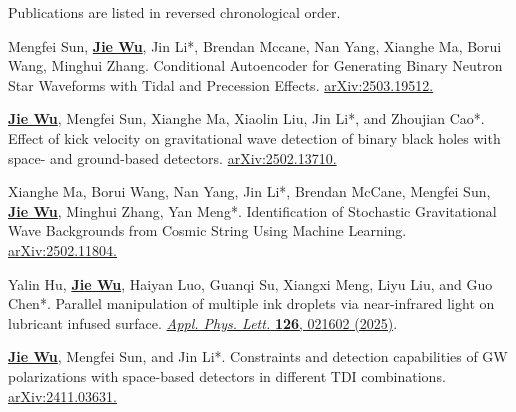 


\begin{cvparagraph}
    Publications are listed in reversed chronological order.
\end{cvparagraph}

\begin{cvpublications}
\begin{pubitems} 
\item {Mengfei Sun, \textbf{\underline{Jie Wu}}, Jin Li*, Brendan Mccane, Nan Yang, Xianghe Ma, Borui Wang, Minghui Zhang. Conditional Autoencoder for Generating Binary Neutron Star Waveforms with Tidal and Precession Effects. \href{https://arxiv.org/abs/2503.19512}{arXiv:2503.19512.}}

\item {\textbf{\underline{Jie Wu}}, Mengfei Sun, Xianghe Ma, Xiaolin Liu, Jin Li*, and Zhoujian Cao*. Effect of kick velocity on gravitational wave detection of binary black holes with space- and ground-based detectors. \href{https://arxiv.org/abs/2502.13710}{arXiv:2502.13710.}}

\item {Xianghe Ma, Borui Wang, Nan Yang, Jin Li*, Brendan McCane, Mengfei Sun, \textbf{\underline{Jie Wu}}, Minghui Zhang, Yan Meng*. Identification of Stochastic Gravitational Wave Backgrounds from Cosmic String Using Machine Learning. \href{https://arxiv.org/abs/2502.11804}{arXiv:2502.11804.}}

\item {Yalin Hu, \textbf{\underline{Jie Wu}}, Haiyan Luo, Guanqi Su, Xiangxi Meng, Liyu Liu, and Guo Chen*. Parallel manipulation of multiple ink droplets via near-infrared light on lubricant infused surface. \href{https://pubs.aip.org/aip/apl/article/126/2/021602/3330590}{\textit{Appl. Phys. Lett.} \textbf{126}, 021602 (2025)}.}

\item {\textbf{\underline{Jie Wu}}, Mengfei Sun, and Jin Li*. Constraints and detection capabilities of GW polarizations with space-based detectors in different TDI combinations. \href{https://arxiv.org/abs/2411.03631}{arXiv:2411.03631.}}


\end{pubitems}
\end{cvpublications}
